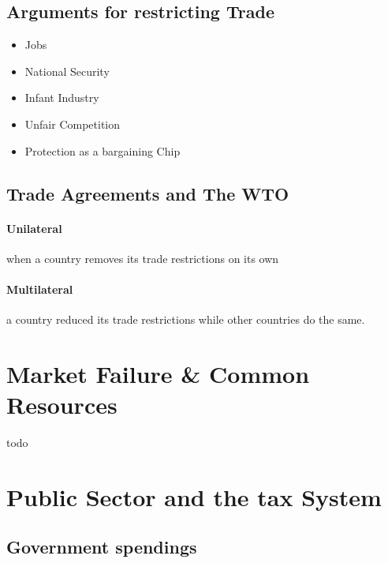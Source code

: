 \documentclass[a4paper,titlepage] {scrartcl}
\begin{document}

\subsection{Arguments for restricting Trade} %
\label{sub:arguments_for_restricting_trade}
\begin{itemize}
	\item Jobs
	\item National Security
	\item Infant Industry
	\item Unfair Competition
	\item Protection as a bargaining Chip
\end{itemize}

\subsection{Trade Agreements and The WTO} %
\label{sub:trade_agreements_and_the_wto}
\paragraph{Unilateral} %
\label{par:unilateral}
when a country removes its trade restrictions on its own

\paragraph{Multilateral} %
\label{par:multilateral}
a country reduced its trade restrictions while other countries do the same.


\section{Market Failure \& Common Resources}

todo

\section{Public Sector and the tax System}
\subsection{Government spendings} %
\label{sub:government_spendings}
\end{document}
